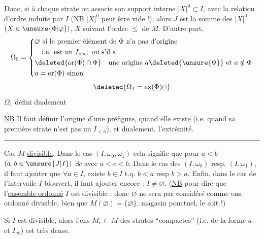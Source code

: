 
Donc, si à chaque strate  on associe son support interne $|X|^{0}\subset I$, avec la relation d'ordre induite par $I$ (NB $|X|^{0}$ peut être vide  !), alors $J$ est la somme   des $|X|^{0}$ $(X\in\unsure{\Phi|\varphi})$, $X$ suivant  l'ordre $\leq$ de $M$. D'autre part, 
\[
\Omega_0=
\left\{\begin{aligned}
&\varnothing\text{ si le premier élément de }\Phi\text{ n'a pas d'origine}\\
&\quad\text{i.e. est un }I_{<a},\text{ ou s'il a}\\
&\deleted{\operatorname{or}(\Phi)\cap\Phi}\quad\text{une origine }a\deleted{\unsure{\Phi}}\text{ et }a\notin\Phi\\
&a=\operatorname{or}(\Phi)\text{ sinon}
\end{aligned}\right.
\]
\[
\deleted{\Omega_1=\operatorname{ex}(\Phi)\cap}
\]
$\Omega_1$ défini dualement

\uline{NB} Il faut définir l'origine d'une préfigure, quand elle existe (i.e. quand sa première strate  n'est pas un $I_{<a}$), et dualement, l'extrémité.

\begin{center}\rule{2.8cm}{0.4pt}\end{center}

Cas $M$ \uline{divisible}. Dans le cas $(I,\omega_0,\omega_1)$ cela signifie que pour $a<b$ $(a,b\in\unsure{J|I})$ $\exists c$ avec $a<c<b$. Dans le cas des $(I,\omega_0)$ resp. $(I,\omega_1)$, il faut ajouter que $\forall a\in I$, existe $b\in I$ t.q. $b<a$ resp $b>a$. Enfin, dans le cas de l'intervalle $I$ biouvert, il faut  ajouter encore : $I\neq\varnothing$. (\uline{NB} pour dire que l'\uline{ensemble ordonné} $I$ est divisible : donc $\varnothing$ ne sera pas considéré comme ens. ordonné divisible, bien que $M(\varnothing)=\{\varnothing\}$, magasin ponctuel, le soit !)

Si $I$ est divisible, alors l'ens $M_c\subset M$ des strates ``compactes'' (i.e. de la forme $a$ et $I_{ab}$) est très dense.
